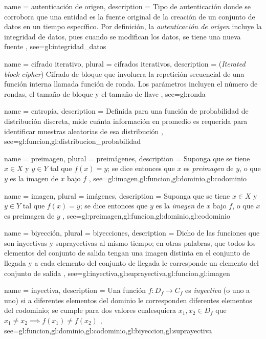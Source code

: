 {
  name = autenticación de origen,
  description = {
    Tipo de autenticación donde se corrobora que una entidad es la fuente
    original de la creación de un conjunto de datos en un tiempo específico.
    Por definición, la \textit{autenticación de origen} incluye la integridad
    de datos, pues cuando se modifican los datos, se tiene una nueva fuente%
  },
  see={gl:integridad_datos}
}

{
  name = cifrado iterativo,
  plural = cifrados iterativos,
  description = {
    (\textit{Iterated block cipher}) Cifrado de bloque que involucra la
    repetición secuencial de una función interna llamada función de ronda. Los
    parámetros incluyen el número de rondas, el tamaño de bloque y
    el tamaño de llave%
  },
  see={gl:ronda}
}

{
  name = entropía,
  description = {
    Definida para una función de probabilidad de distribución discreta,
    mide cuánta información en promedio es requerida para identificar
    muestras aleatorias de esa distribución%
  },
  see={gl:funcion,gl:distribucion_probabilidad}
}

{
  name = preimagen,
  plural = preimágenes,
  description = {
    Suponga que se tiene $x \in X$ y $y \in Y$ tal que $f(x) = y$;
    se dice entonces que $x$ es \textit{preimagen} de $y$, o que
    $y$ es la imagen de $x$ bajo $f$%
  },
  see={gl:imagen,gl:funcion,gl:dominio,gl:codominio}
}

{
  name = imagen,
  plural = imágenes,
  description = {
    Suponga que se tiene $x \in X$ y $y \in Y$ tal que $f(x) = y$;
    se dice entonces que $y$ es la \textit{imagen} de $x$ bajo $f$,
    o que $x$ es preimagen de $y$%
  },
  see={gl:preimagen,gl:funcion,gl:dominio,gl:codominio}
}

{
  name = biyección,
  plural = biyecciones,
  description = {
    Dicho de las funciones que son inyectivas y
    suprayectivas al mismo tiempo; en otras palabras, que todos los
    elementos del conjunto de salida tengan una imagen distinta en el conjunto
    de llegada y a cada elemento del conjunto de llegada le corresponde
    un elemento del conjunto de salida%
  },
  see={gl:inyectiva,gl:suprayectiva,gl:funcion,gl:imagen}
}

{
  name = inyectiva,
  description = {
    Una función $f:D_f \rightarrow C_f$ es \textit{inyectiva} (o uno a
    uno) si a diferentes elementos del dominio le corresponden
    diferentes elementos del codominio; se cumple para dos
    valores cualesquiera $x_1, x_2 \in D_f$ que
    $x_1 \neq x_2 \implies f(x_1) \neq f(x_2)$%
  },
  see={gl:funcion,gl:dominio,gl:codominio,gl:biyeccion,gl:suprayectiva}
}

